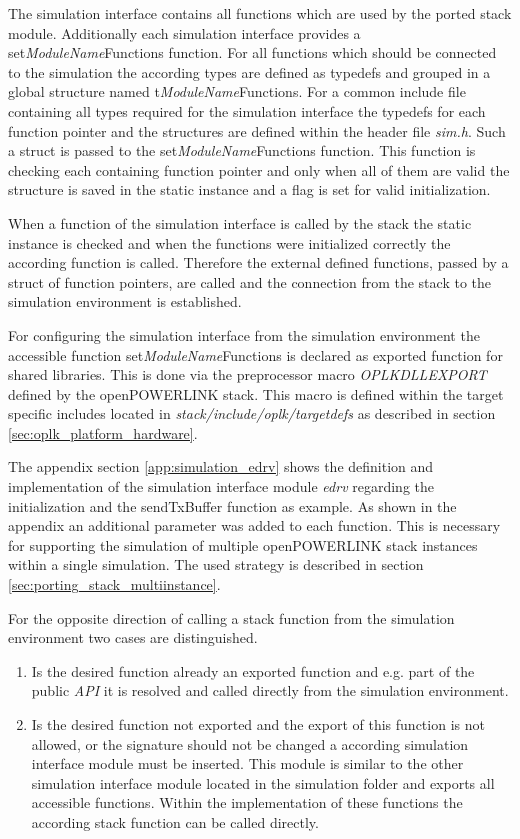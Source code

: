 \begin{sloppypar}
The simulation interface contains all functions which are used by the ported stack module.
Additionally each simulation interface provides a set\emph{ModuleName}Functions function.
For all functions which should be connected to the simulation the according types are defined as typedefs and grouped in a global structure named t\emph{ModuleName}Functions.
For a common include file containing all types required for the simulation interface the typedefs for each function pointer and the structures are defined within the header file \emph{sim.h}.
Such a struct is passed to the set\emph{ModuleName}Functions function.
This function is checking each containing function pointer and only when all of them are valid the structure is saved in the static instance and a flag is set for valid initialization.
\end{sloppypar}

When a function of the simulation interface is called by the stack the static instance is checked and when the functions were initialized correctly the according function is called.
Therefore the external defined functions, passed by a struct of function pointers, are called and the connection from the stack to the simulation environment is established.

For configuring the simulation interface from the simulation environment the accessible function set\emph{ModuleName}Functions is declared as exported function for shared libraries.
This is done via the preprocessor macro \emph{OPLKDLLEXPORT} defined by the openPOWERLINK stack.
This macro is defined within the target specific includes located in \emph{stack/include/oplk/targetdefs} as described in section \ref{sec:oplk_platform_hardware}.

The appendix section \ref{app:simulation_edrv} shows the definition and implementation of the simulation interface module \emph{edrv} regarding the initialization and the sendTxBuffer function as example.
As shown in the appendix an additional parameter was added to each function.
This is necessary for supporting the simulation of multiple openPOWERLINK stack instances within a single simulation.
The used strategy is described in section \ref{sec:porting_stack_multiinstance}.

For the opposite direction of calling a stack function from the simulation environment two cases are distinguished.

\begin{enumerate}
    \item Is the desired function already an exported function and e.g. part of the public \emph{API} it is resolved and called directly from the simulation environment.
    \item Is the desired function not exported and the export of this function is not allowed, or the signature should not be changed a according simulation interface module must be inserted.
    This module is similar to the other simulation interface module located in the simulation folder and exports all accessible functions.
    Within the implementation of these functions the according stack function can be called directly.
\end{enumerate}

